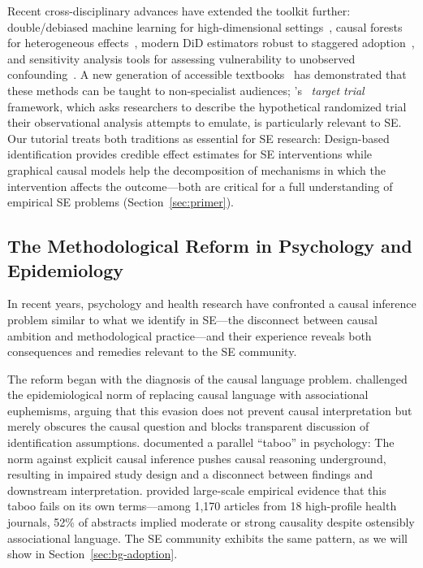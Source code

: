 Recent cross-disciplinary advances have extended the toolkit further: double/debiased machine learning for high-dimensional settings~\cite{chernozhukov2018double}, causal forests for heterogeneous effects~\cite{athey2016recursive}, modern DiD estimators robust to staggered adoption~\cite{callaway2021difference, roth2023whats}, and sensitivity analysis tools for assessing vulnerability to unobserved confounding~\cite{rosenbaum2002observational, oster2019unobservable, cinelli2020making}.
A new generation of accessible textbooks~\cite{angrist2009mostly, hernan2020causal, cunningham2021causal, huntingtonklein2021effect} has demonstrated that these methods can be taught to non-specialist audiences; \citeauthor{hernan2020causal}'s~\cite{hernan2020causal} \emph{target trial} framework, which asks researchers to describe the hypothetical randomized trial their observational analysis attempts to emulate, is particularly relevant to SE\@.
Our tutorial treats both traditions as essential for SE research: Design-based identification provides credible effect estimates for SE interventions while graphical causal models help the decomposition of mechanisms in which the intervention affects the outcome---both are critical for a full understanding of empirical SE problems (Section~\ref{sec:primer}).


\subsection{The Methodological Reform in Psychology and Epidemiology}
\label{sec:appendix-psych-reform}

In recent years, psychology and health research have confronted a causal inference problem similar to what we identify in SE---the disconnect between causal ambition and methodological practice---and their experience reveals both consequences and remedies relevant to the SE community.

The reform began with the diagnosis of the causal language problem.
\citet{hernan2018cword} challenged the epidemiological norm of replacing causal language with associational euphemisms, arguing that this evasion does not prevent causal interpretation but merely obscures the causal question and blocks transparent discussion of identification assumptions.
\citet{grosz2020taboo} documented a parallel ``taboo'' in psychology: The norm against explicit causal inference pushes causal reasoning underground, resulting in impaired study design and a disconnect between findings and downstream interpretation.
\citet{haber2022causal} provided large-scale empirical evidence that this taboo fails on its own terms---among 1,170 articles from 18 high-profile health journals, 52\% of abstracts implied moderate or strong causality despite ostensibly associational language.
The SE community exhibits the same pattern, as we will show in Section~\ref{sec:bg-adoption}.

